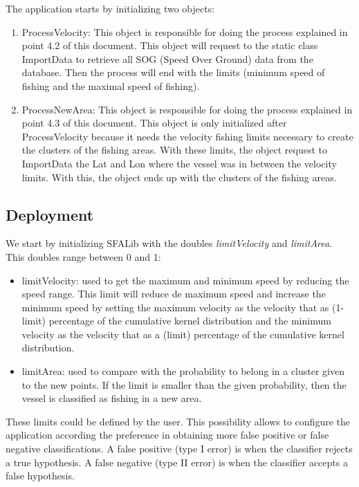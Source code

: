 The application starts by initializing two objects:
\begin{enumerate}
\item ProcessVelocity: This object is responsible for doing the process explained in point 4.2 of this document. This object will request to the static class ImportData to retrieve all SOG (Speed Over Ground) data from the database. Then the process will end with the limits (minimum speed of fishing and the maximal speed of fishing).
\item ProcessNewArea: This object is responsible for doing the process explained in point 4.3 of this document. This object is only initialized after ProcessVelocity because it needs the velocity fishing limits necessary to create the clusters of the fishing areas. With these limits, the object request to ImportData the Lat and Lon where the vessel was in between the velocity limits. With this, the object ends up with the clusters of the fishing areas.
\end{enumerate}



\subsection{Deployment} %
\label{sub:deployment}

We start by initializing SFALib with the doubles \emph{limitVelocity} and \emph{limitArea}. This doubles range between 0 and 1:
\begin{itemize}
\item limitVelocity: used to get the maximum and minimum speed by reducing the speed range. This limit will reduce de maximum speed and increase the minimum speed by setting the maximum velocity as the velocity that as (1-limit) percentage of the cumulative kernel distribution and the minimum velocity as the velocity that as a (limit) percentage of the cumulative kernel distribution.
\item limitArea: used to compare with the probability to belong in a cluster given to the new points. If the limit is smaller than the given probability, then the vessel is classified as fishing in a new area.
\end{itemize}
These limits could be defined by the user. This possibility allows to configure the application according the preference in obtaining more false positive or false negative classifications.
A false positive (type I error) is when the classifier rejects a true hypothesis.
A false negative (type II error) is when the classifier accepts a false hypothesis.

